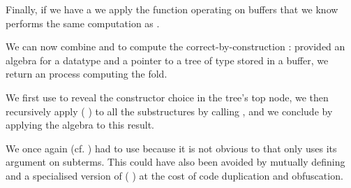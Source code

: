 Finally, if we have a  we apply the function operating
on buffers that we know performs the same computation as .


We can now combine  and  to compute
the correct-by-construction : provided an algebra for
a datatype  and a pointer to a tree of type 
stored in a buffer, we return an  process computing the fold.


We first use  to reveal the constructor choice in the
tree's top node, we then recursively apply ( )
to all the substructures by calling , and we conclude by
applying the algebra to this result.

We once again (cf. ) had to
use \assertTotal{} because it is not obvious to
\idris{} that  only uses its argument on subterms.
%
This could have also been avoided by mutually defining 
and a specialised version of
( \IdrisKeyword{(} \IdrisKeyword{)})
at the cost of code duplication and obfuscation.
